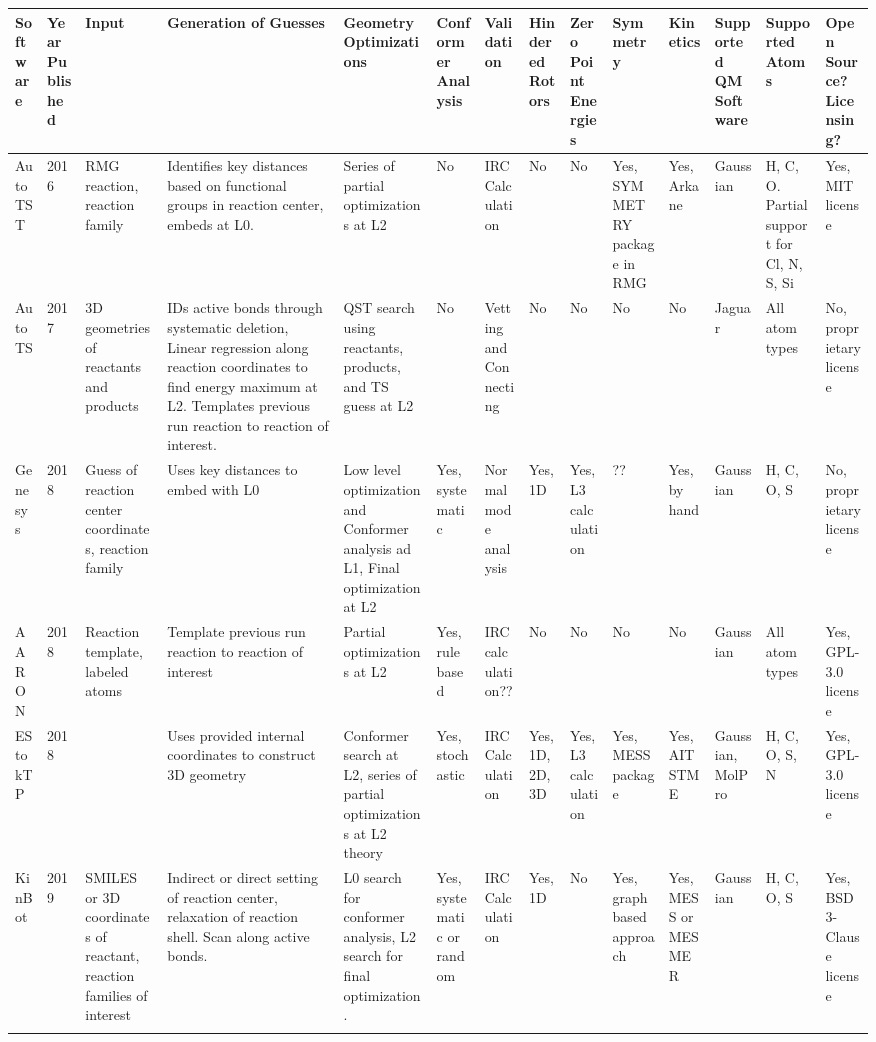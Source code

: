 \documentclass[preprint, 11pt]{elsarticle} %
\begin{document}
\begin{singlespace}
\begin{adjustbox}{angle=90}
\begin{scriptsize}
\begin{centering}
\begin{tabular}{m{0.5in}||m{0.25in} | m{0.5in} | m{0.8in} | m{0.75in}| m{0.5in}| m{0.5in }|m{0.5in}| m{0.5in}| m{0.5in}| m{0.5in}| m{0.5in}| m{0.5in}}
    
    Software & Year Published & Input & Generation of Guesses & Geometry Optimizations & Conformer Analysis & Validation & Hindered Rotors & Zero Point Energies & Symmetry & Kinetics & Supported QM Software & Supported Atoms & Open Source? Licensing? \\
    \hline
    \hline
    AutoTST & 2016 & RMG reaction, reaction family & Identifies key distances based on functional groups in reaction center, embeds at L0. & Series of partial optimizations at L2 & No & IRC Calculation & No & No & Yes, SYMMETRY package in RMG & Yes, Arkane & Gaussian & H, C, O. Partial support for Cl, N, S, Si & Yes, MIT license \\
    \hline
    AutoTS  & 2017 & 3D geometries of reactants and products & IDs active bonds through systematic deletion, Linear regression along reaction coordinates to find energy maximum at L2. Templates previous run reaction to reaction of interest. & QST search using reactants, products, and TS guess at L2 & No & Vetting and Connecting & No & No & No & No & Jaguar & All atom types & No, proprietary license \\
    \hline 
    Genesys & 2018 & Guess of reaction center coordinates, reaction family & Uses key distances to embed with L0 & Low level optimization and Conformer analysis ad L1, Final optimization at L2 & Yes, systematic & Normal mode analysis & Yes, 1D & Yes, L3 calculation & ?? & Yes, by hand & Gaussian& H, C, O, S & No, proprietary license \\ 
    \hline
    AARON   & 2018 & Reaction template, labeled atoms & Template previous run reaction to reaction of interest & Partial optimizations at L2 & Yes, rule based & IRC calculation?? & No & No & No & No & Gaussian & All atom types & Yes, GPL-3.0 license \\ 
    \hline
    EStokTP & 2018 & & Uses provided internal coordinates to construct 3D geometry & Conformer search at L2, series of partial optimizations at L2 theory & Yes, stochastic & IRC Calculation &Yes, 1D, 2D, 3D & Yes, L3 calculation & Yes, MESS package & Yes, AITSTME & Gaussian, MolPro & H, C, O, S, N & Yes, GPL-3.0 license  \\ 
    \hline
    KinBot  & 2019 & SMILES or 3D coordinates of reactant, reaction families of interest & Indirect or direct setting of reaction center, relaxation of reaction shell. Scan along active bonds.  & L0 search for conformer analysis, L2 search for final optimization. & Yes, systematic or random & IRC Calculation & Yes, 1D & No & Yes, graph based approach & Yes, MESS or MESMER & Gaussian & H, C, O, S & Yes, BSD 3-Clause license \\ 
    \hline
    \label{table:comparison}


\end{tabular}
\end{centering}
\end{scriptsize}
\end{adjustbox}
\end{singlespace}
\end{document}
